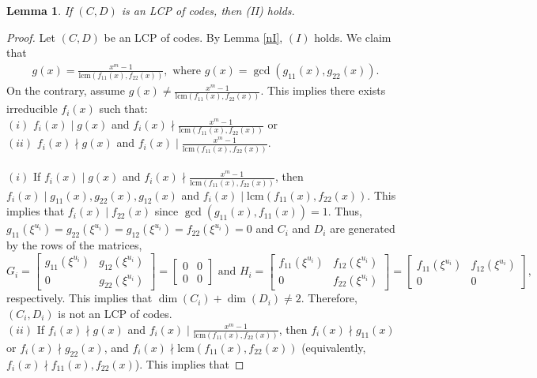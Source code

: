 \documentclass[12 pt]{extarticle}
\numberwithin{equation}{section}
\newtheorem{lemma}[theorem]{Lemma}
\theoremstyle{definition}
\begin{document}
\begin{lemma} \label{nII} If $(C,D)$ is an LCP of codes, then  (II) holds. 
\end{lemma}
\begin{proof}
 Let $(C,D)$ be an LCP of codes. By Lemma \ref{nI}, $(I)$ holds. We claim that
\begin{align}\label{ii.1}
g(x)= \frac{x^m-1}{\text{lcm}(f_{11}(x),f_{22}(x))}, \text{ where } g(x)=\gcd(g_{11}(x),g_{22}(x)).
\end{align}
On the contrary, assume $g(x)\neq \frac{x^m-1}{\text{lcm}(f_{11}(x),f_{22}(x))}$. This implies there exists irreducible $f_i(x)$ such that:\\
    $(i)$ $f_i(x)\mid g(x)$ and $f_i(x)\nmid \frac{x^m-1}{\text{lcm}(f_{11}(x),f_{22}(x))} $ or \\
    $(ii)$ $f_i(x)\nmid g(x)$ and $f_i(x)\mid \frac{x^m-1}{\text{lcm}(f_{11}(x),f_{22}(x))} $.\\\\
    $(i)$ If $f_i(x)\mid g(x)$ and $f_i(x)\nmid \frac{x^m-1}{\text{lcm}(f_{11}(x),f_{22}(x))} $, then $f_i(x)\mid g_{11}(x),g_{22}(x),g_{12}(x)$ and $f_i(x)\mid  \text{lcm}(f_{11}(x),f_{22}(x))$. This implies that $f_i(x)\mid f_{22}(x)$ since $\gcd(g_{11}(x),f_{11}(x))=1$.  Thus, $g_{11}(\xi^{u_i})= g_{22}(\xi^{u_i})=g_{12}(\xi^{u_i})=f_{22}(\xi^{u_i})=0$ and $C_i$ and $D_i$ are generated by the rows of the  matrices,
$$
G_i=\begin{bmatrix}
g_{11}(\xi^{u_i}) & g_{12}(\xi^{u_i}) \\
0 & g_{22}(\xi^{u_i}) 
\end{bmatrix}    = \begin{bmatrix}
0 & 0 \\
0 & 0 
\end{bmatrix} \text{ and } H_i=\begin{bmatrix}
f_{11}(\xi^{u_i}) & f_{12}(\xi^{u_i}) \\
0 & f_{22}(\xi^{u_i}) 
\end{bmatrix}    = \begin{bmatrix}
f_{11}(\xi^{u_i}) & f_{12}(\xi^{u_i}) \\
0 & 0  
\end{bmatrix},
$$ respectively.
This implies that  $\dim(C_i)+\dim(D_i)\neq 2$.  Therefore, $(C_i, D_i)$ is not an LCP of codes.  \\
$(ii)$ If $f_i(x)\nmid g(x)$ and $f_i(x)\mid \frac{x^m-1}{\text{lcm}(f_{11}(x),f_{22}(x))}$, then $f_i(x)\nmid g_{11}(x)$ or $f_i(x)\nmid g_{22}(x)$, and  $f_i(x)\nmid \text{lcm}(f_{11}(x),f_{22}(x))$   (equivalently, $f_i(x)\nmid f_{11}(x),f_{22}(x)$). This implies that 

\end{proof}
\end{document}
